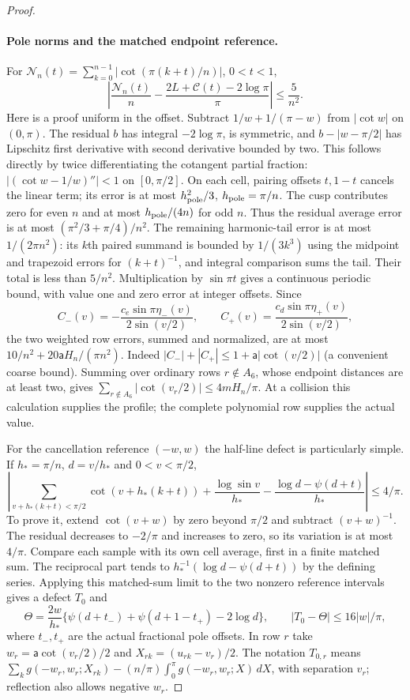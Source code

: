 \begin{proof}
\paragraph{Pole norms and the matched endpoint reference.}
For $\mathcal{N}_n(t)=\sum_{k=0}^{n-1}|\cot(\pi(k+t)/n)|$, $0<t<1$,
\begin{equation}\label{uc:pole-error}
 \left|\frac{\mathcal{N}_n(t)}n-
 \frac{2L+\mathcal C(t)-2\log\pi}{\pi}\right|\leq\frac5{n^2}.
\end{equation}
Here is a proof uniform in the offset. Subtract $1/w+1/(\pi-w)$
from $|\cot w|$ on $(0,\pi)$. The residual $b$ has integral
$-2\log\pi$, is symmetric, and $b-|w-\pi/2|$ has Lipschitz
first derivative with second derivative bounded by two.
This follows directly by twice differentiating the cotangent partial
fraction: $|(\cot w-1/w)''|<1$ on $[0,\pi/2]$.
On each cell, pairing offsets $t,1-t$ cancels the linear term;
its error is at most $h_{\rm pole}^2/3$, $h_{\rm pole}=\pi/n$. The cusp contributes zero
for even $n$ and at most $h_{\rm pole}/(4n)$ for odd $n$. Thus the residual
average error is at most $(\pi^2/3+\pi/4)/n^2$.
The remaining harmonic-tail error is at most $1/(2\pi n^2)$:
its $k$th paired summand is bounded by $1/(3k^3)$ using the
midpoint and trapezoid errors for $(k+t)^{-1}$, and integral comparison
sums the tail. Their total is less than $5/n^2$.
Multiplication by $\sin\pi t$ gives a continuous periodic bound,
with value one and zero error at integer offsets. Since
\[
 C_-(v)=-\frac{c_e\sin\pi\eta_-(v)}{2\sin(v/2)},\qquad
 C_+(v)= \frac{c_d\sin\pi\eta_+(v)}{2\sin(v/2)},
\]
the two weighted row errors, summed and normalized, are at most
$10/n^2+20\mathsf{a}H_n/(\pi n^2)$. Indeed
$|C_-|+|C_+|\leq1+\mathsf{a}|\cot(v/2)|$ (a convenient coarse bound).
Summing over ordinary rows $r\notin A_6$, whose endpoint distances
are at least two, gives $\sum_{r\notin A_6}|\cot(v_r/2)|\leq4mH_n/\pi$.
At a collision this calculation supplies the profile; the complete
polynomial row supplies the actual value.

For the cancellation reference $(-w,w)$ the half-line defect is
particularly simple. If $h_*=\pi/n$, $d=v/h_*$ and $0<v<\pi/2$,
\[
 \left|\sum_{v+h_*(k+t)<\pi/2}\cot(v+h_*(k+t))
       +\frac{\log\sin v}{h_*}
       -\frac{\log d-\psi(d+t)}{h_*}\right|\leq4/\pi.
\]
To prove it, extend $\cot(v+w)$ by zero beyond $\pi/2$ and subtract
$(v+w)^{-1}$. The residual decreases to $-2/\pi$ and increases to
zero, so its variation is at most $4/\pi$. Compare each sample with
its own cell average, first in a finite matched sum. The reciprocal
part tends to $h_*^{-1}(\log d-\psi(d+t))$ by the defining series.
Applying this matched-sum limit to the two
nonzero reference intervals gives a defect $T_0$ and
\begin{equation}\label{uc:halfline}
 \Theta=\frac{2w}{h_*}
 \{\psi(d+t_-)+\psi(d+1-t_+)-2\log d\},
 \qquad |T_0-\Theta|\leq16|w|/\pi,
\end{equation}
where $t_-,t_+$ are the actual fractional pole offsets.
In row $r$ take $w_r=\mathsf{a}\cot(v_r/2)/2$ and
$X_{rk}=(u_{rk}-v_r)/2$. The notation $T_{0,r}$ means
$\sum_k g(-w_r,w_r;X_{rk})-(n/\pi)\int_0^\pi
g(-w_r,w_r;X)\,dX$, with separation $v_r$;
reflection also allows negative $w_r$.


\end{proof}
